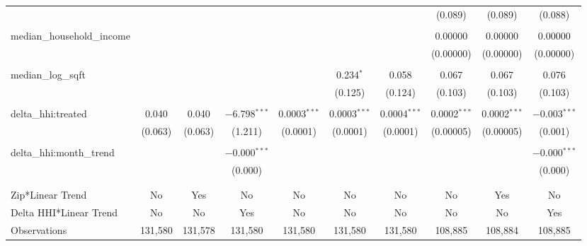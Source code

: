 \begin{table}[H]
{\begin{tabular}{@{\extracolsep{5pt}}lccccccccc}
   &  &  &  &  &  &  & (0.089) & (0.089) & (0.088) \\  

   & & & & & & & & & \\  

  median\_household\_income &  &  &  &  &  &  & 0.00000 & 0.00000 & 0.00000 \\  

   &  &  &  &  &  &  & (0.00000) & (0.00000) & (0.00000) \\  

   & & & & & & & & & \\  

  median\_log\_sqft &  &  &  &  & 0.234$^{*}$ & 0.058 & 0.067 & 0.067 & 0.076 \\  

   &  &  &  &  & (0.125) & (0.124) & (0.103) & (0.103) & (0.103) \\  

   & & & & & & & & & \\  

  delta\_hhi:treated & 0.040 & 0.040 & $-$6.798$^{***}$ & 0.0003$^{***}$ & 0.0003$^{***}$ & 0.0004$^{***}$ & 0.0002$^{***}$ & 0.0002$^{***}$ & $-$0.003$^{***}$ \\  

   & (0.063) & (0.063) & (1.211) & (0.0001) & (0.0001) & (0.0001) & (0.00005) & (0.00005) & (0.001) \\  

   & & & & & & & & & \\  

  delta\_hhi:month\_trend &  &  & $-$0.000$^{***}$ &  &  &  &  &  & $-$0.000$^{***}$ \\  

   &  &  & (0.000) &  &  &  &  &  & (0.000) \\  

   & & & & & & & & & \\  

 \hline \\[-1.8ex]  

 Zip*Linear Trend & No & Yes & No & No & No & No & No & Yes & No \\  

 Delta HHI*Linear Trend & No & No & Yes & No & No & No & No & No & Yes \\  

 Observations & 131,580 & 131,578 & 131,580 & 131,580 & 131,580 & 131,580 & 108,885 & 108,884 & 108,885 \\  


\end{tabular}}
\end{table}
